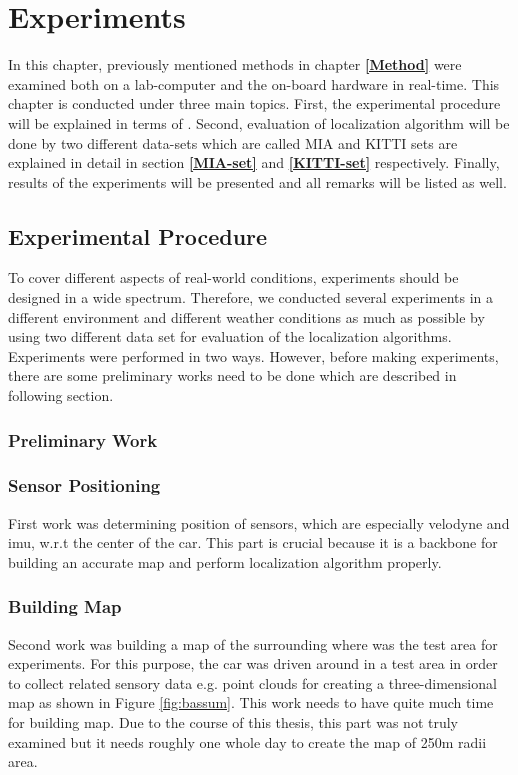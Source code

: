 \chapter{Experiments}
In this chapter, previously mentioned methods in chapter \textbf{\ref{Method}} were examined both on a lab-computer and the on-board hardware in real-time. This chapter is conducted under three main topics. First, the experimental procedure will be explained in terms of%
. Second, evaluation of localization algorithm will be done by two different data-sets which are called MIA and KITTI sets are explained in detail in section \textbf{\ref{MIA-set}} and \textbf{\ref{KITTI-set}} respectively. Finally, results of the experiments will be presented and all remarks will be listed as well.

\section{Experimental Procedure}
To cover different aspects of real-world conditions, experiments should be designed in a wide spectrum. Therefore, we conducted several experiments in a different environment and different weather conditions as much as possible by using two different data set for evaluation of the localization algorithms. Experiments were performed in two ways. However, before making experiments, there are some preliminary works need to be done which are described in following section. %
\subsection{Preliminary Work}
\subsection*{Sensor Positioning} 
First work was determining position of sensors, which are especially velodyne and imu, w.r.t the center of the car. This part is crucial because it is a backbone for building an accurate map and perform localization algorithm properly. \\
\subsection*{Building Map}\label{mapping}
Second work was building a map of the surrounding where was the test area for experiments. For this purpose, the car was driven around in a test area in order to collect related sensory data e.g. point clouds for creating a three-dimensional map as shown in Figure \ref{fig:bassum}. This work needs to have quite much time for building map. Due to the course of this thesis, this part was not truly examined but it needs roughly one whole day to create the map of 250m radii area.

